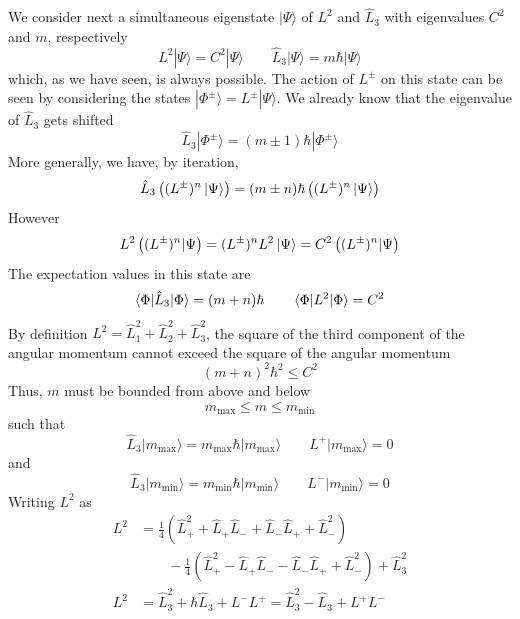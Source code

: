 \documentclass[../../../main.tex]{subfiles}
\begin{document}
We consider next a simultaneous eigenstate $|\Psi\rangle$ of $L^2$ and $\hat{L}_3$ with eigenvalues $C^2$ and $m$, respectively
\begin{equation*}
    L^2|\Psi\rangle = C^2|\Psi\rangle     \qquad
    \hat{L}_3|\Psi\rangle = m \hbar |\Psi\rangle
\end{equation*}
which, as we have seen, is always possible.
The action of  $L^\pm$ on this state can be seen by considering the states $|\Phi^\pm\rangle = L^\pm|\Psi\rangle$.
We already know that the eigenvalue of $\hat{L}_3$ gets shifted
\begin{equation*}
    \hat{L}_3|\Phi^\pm\rangle = (m \pm 1) \hbar |\Phi^\pm\rangle
\end{equation*}
More generally, we have, by iteration,
\begin{equation*}
    \hat{L}_3 \left( (L^{\pm})^n  \ket{\Psi} \right) = (m \pm n) \hbar  \left( (L^{\pm})^n \ket{\Psi} \right)
\end{equation*}
However
\begin{equation*}
    L^2 \left( (L^{\pm})^n | \Psi \right) = (L^{\pm})^n L^2 \ket{\Psi} = C^2 \left( (L^{\pm})^n | \Psi \right)
\end{equation*}
The  expectation values in this state are
\begin{equation*}
    \braket{\Phi | \hat{L}_3|\Phi} = (m+n) \hbar \qquad
    \braket{\Phi | L^2|\Phi} = C^2
\end{equation*}
By definition $L^2=\hat{L}_1^2+\hat{L}_2^2+\hat{L}_3^2$, the square of the third component of the angular momentum cannot exceed the square of the angular momentum
\begin{equation*}
    (m + n)^2 \hbar ^2 \leq C^2
\end{equation*}
Thus, \( m \) must be bounded from above and below
\begin{equation*}
    m_{\text{max}} \leq m \leq m_{\text{min}}
\end{equation*}
such that
\begin{equation*}
    \hat{L}_3 | m_{\text{max}} \rangle = m_{\text{max}} \hbar  | m_{\text{max}} \rangle \qquad
    L^+ | m_{\text{max}} \rangle = 0
\end{equation*}
and
\begin{equation*}
    \hat{L}_3 | m_{\text{min}} \rangle = m_{\text{min}} \hbar  | m_{\text{min}} \rangle \qquad
    L^- | m_{\text{min}} \rangle = 0
\end{equation*}
Writing $L^2$ as
\begin{align*}
    L^2 & = \frac{1}{4} \left( \hat{L}_+^2 + \hat{L}_+ \hat{L}_- + \hat{L}_- \hat{L}_+ + \hat{L}_-^2 \right)                     \\
        & \qquad - \frac{1}{4} \left( \hat{L}_+^2 - \hat{L}_+ \hat{L}_- - \hat{L}_- \hat{L}_+ + \hat{L}_-^2 \right) +\hat{L}_3^2 \\
    L^2
        & = \hat{L}_3^2 +\hbar  \hat{L}_3 + L^- L^+ =  \hat{L}_3^2 - \hat{L}_3 + L^+ L^-
\end{align*}
\end{document}
